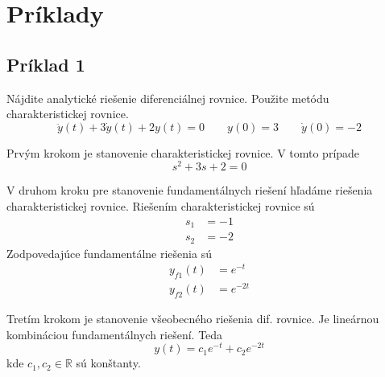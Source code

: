 \documentclass[a4paper, 10pt, ]{article}
\begin{document}
\section{Príklady}

\subsection{Príklad 1}

Nájdite analytické riešenie diferenciálnej rovnice. Použite metódu charakteristickej rovnice.
\begin{equation*} 
    \ddot y(t) + 3\dot y(t) + 2 y(t) = 0 \qquad y(0)=3 \qquad \dot y(0) = -2
\end{equation*}

Prvým krokom je stanovenie charakteristickej rovnice. V tomto prípade
\begin{equation}
    s^2 + 3s + 2 = 0
\end{equation}

V druhom kroku pre stanovenie fundamentálnych riešení hľadáme riešenia charakteristickej rovnice. Riešením charakteristickej rovnice sú
\begin{subequations}
    \begin{align}
        s_1 &= -1 \\
        s_2 &= -2
    \end{align}
\end{subequations}
Zodpovedajúce fundamentálne riešenia sú
\begin{subequations}
    \begin{align}
        y_{f1}(t) &= e^{-t} \\
        y_{f2}(t) &= e^{-2t}
    \end{align}
\end{subequations}

Tretím krokom je stanovenie všeobecného riešenia dif. rovnice. Je lineárnou kombináciou fundamentálnych riešení. Teda
\begin{equation}
    y(t) = c_1 e^{-t} + c_2 e^{-2t}
\end{equation}
kde $c_1, c_2 \in \mathbb{R}$ sú konštanty.
\end{document}
